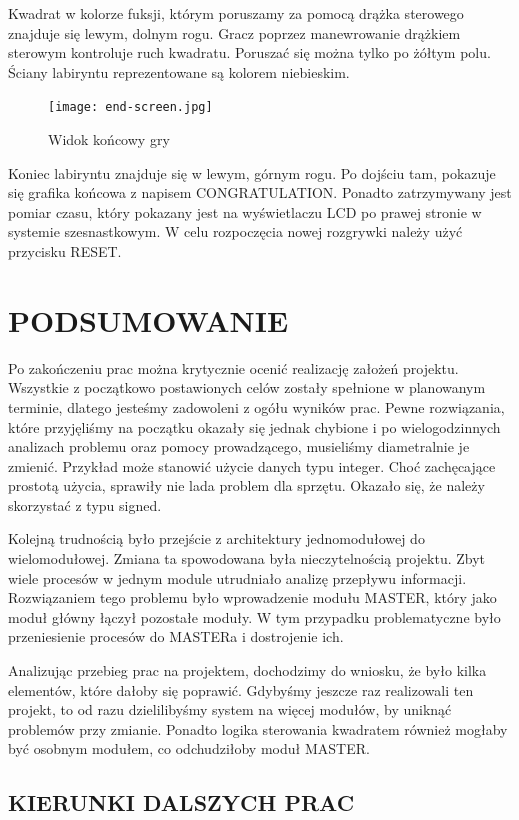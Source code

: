 \documentclass[11pt]{article}
\begin{document}
Kwadrat w kolorze fuksji, którym poruszamy za pomocą drążka sterowego znajduje się lewym, dolnym rogu.
Gracz poprzez manewrowanie drążkiem sterowym kontroluje ruch kwadratu.
Poruszać się można tylko po żółtym polu. Ściany labiryntu reprezentowane są kolorem niebieskim.

\begin{figure}[H]
\centering
\texttt{[image: end-screen.jpg]}
\caption{Widok końcowy gry}
\end{figure}

Koniec labiryntu znajduje się w lewym, górnym rogu.
Po dojściu tam, pokazuje się grafika końcowa z napisem CONGRATULATION. %
Ponadto zatrzymywany jest pomiar czasu, który pokazany jest na wyświetlaczu LCD po prawej stronie w systemie szesnastkowym.
W celu rozpoczęcia nowej rozgrywki należy użyć przycisku RESET.

\section{PODSUMOWANIE}

Po zakończeniu prac można krytycznie ocenić realizację założeń projektu.
Wszystkie z początkowo postawionych celów zostały spełnione w planowanym terminie, dlatego jesteśmy zadowoleni z ogółu wyników prac.
Pewne rozwiązania, które przyjęliśmy na początku okazały się jednak chybione i po wielogodzinnych analizach problemu oraz pomocy prowadzącego, musieliśmy diametralnie je zmienić.
Przykład może stanowić użycie danych typu integer.
Choć zachęcające prostotą użycia, sprawiły nie lada problem dla sprzętu.
Okazało się, że należy skorzystać z typu signed.

Kolejną trudnością było przejście z architektury jednomodułowej do wielomodułowej.
Zmiana ta spowodowana była nieczytelnością projektu.
Zbyt wiele procesów w jednym module utrudniało analizę przepływu informacji.
Rozwiązaniem tego problemu było wprowadzenie modułu MASTER, który jako moduł główny łączył pozostałe moduły.
W tym przypadku problematyczne było przeniesienie procesów do MASTERa i dostrojenie ich.

Analizując przebieg prac na projektem, dochodzimy do wniosku, że było kilka elementów, które dałoby się poprawić.
Gdybyśmy jeszcze raz realizowali ten projekt, to od razu dzielilibyśmy system na więcej modułów, by uniknąć problemów przy zmianie.
Ponadto logika sterowania kwadratem również mogłaby być osobnym modułem, co odchudziłoby moduł MASTER.

\subsection{KIERUNKI DALSZYCH PRAC}
\end{document}
